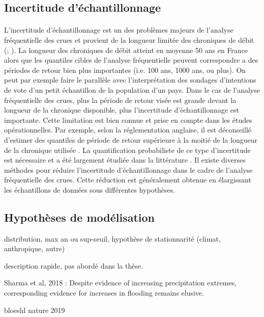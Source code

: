\documentclass[11pt]{article}
\begin{document}
	\subsection{Incertitude d'échantillonnage}
	
	\paragraph{} L'incertitude d'échantillonnage est un des problèmes majeurs de l'analyse fréquentielle des crues et provient de la longueur limitée des chroniques de débit (\citet{apel_flood_2004}; \citet{kjeldsen_uncertainty_2011}). La longueur des chroniques de débit atteint en moyenne 50 ans en France \citep{le_coz_quantifying_2017} alors que les quantiles cibles de l'analyse fréquentielle peuvent correspondre a des périodes de retour bien plus importantes (i.e. 100 ans, 1000 ans, ou plus). On peut par exemple faire le parallèle avec l'interprétation des sondages d'intentions de vote d'un petit échantillon de la population d'un pays. Dans le cas de l'analyse fréquentielle des crues, plus la période de retour visée est grande devant la longueur de la chronique disponible, plus l'incertitude d'échantillonnage est importante. Cette limitation est bien connue et prise en compte dans les études opérationnelles. Par exemple, selon la réglementation anglaise, il est déconseillé d'estimer des quantiles de période de retour supérieure à la moitié de la longueur de la chronique utilisée \citep{whs_flood_2008}. La quantification probabiliste de ce type d'incertitude est nécessaire et a été largement étudiée dans la littérature \citep{renard_application_2006}. Il existe diverses méthodes pour réduire l'incertitude d'échantillonnage dans le cadre de l'analyse fréquentielle des crues. Cette réduction est généralement obtenue en élargissant les échantillons de données sous différentes hypothèses.
	
	
		\subsection{Hypothèses de modélisation}
	distribution, max an ou sup-seuil, hypothèse de stationnarité (climat, anthropique, autre)
	
	description rapide, pas abordé dans la thèse.
	
	Sharma et al, 2018 : Despite evidence of increasing precipitation extremes, corresponding evidence for increases in flooding remains elusive. 
	
	bloeshl nature 2019
	
\end{document}
